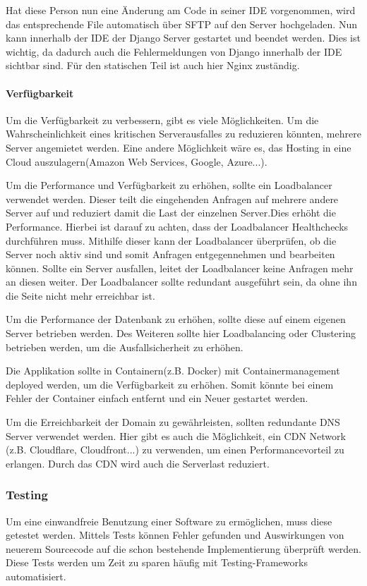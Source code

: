 Hat diese Person nun eine Änderung am Code in seiner IDE vorgenommen, wird das entsprechende File automatisch über SFTP auf den Server hochgeladen. Nun kann innerhalb der IDE der Django Server gestartet und beendet werden. Dies ist wichtig, da dadurch auch die Fehlermeldungen von Django innerhalb der \gls{IDE} sichtbar sind. Für den statischen Teil ist auch hier Nginx zuständig.

\paragraph{Verfügbarkeit}
Um die Verfügbarkeit zu verbessern, gibt es viele Möglichkeiten. Um die Wahrscheinlichkeit eines kritischen Serverausfalles zu reduzieren könnten, mehrere Server angemietet werden. Eine andere Möglichkeit wäre es, das Hosting in eine Cloud auszulagern(Amazon Web Services, Google, Azure...). 

Um die Performance und Verfügbarkeit zu erhöhen, sollte ein Loadbalancer verwendet werden. Dieser teilt die eingehenden Anfragen auf mehrere andere Server auf und reduziert damit die Last der einzelnen Server.Dies erhöht die Performance. Hierbei ist darauf zu achten, dass der Loadbalancer Healthchecks durchführen muss. Mithilfe dieser kann der Loadbalancer überprüfen, ob die Server noch aktiv sind und somit Anfragen entgegennehmen und bearbeiten können. Sollte ein Server ausfallen, leitet der Loadbalancer keine Anfragen mehr an diesen weiter. Der Loadbalancer sollte redundant ausgeführt sein, da ohne ihn die Seite nicht mehr erreichbar ist. 

Um die Performance der Datenbank zu erhöhen, sollte diese auf einem eigenen Server betrieben werden. Des Weiteren sollte hier Loadbalancing oder Clustering betrieben werden, um die Ausfallsicherheit zu erhöhen. \citep{CLUSTER}

Die Applikation sollte in Containern(z.B. Docker) mit Containermanagement deployed werden, um die Verfügbarkeit zu erhöhen. Somit könnte bei einem Fehler der Container einfach entfernt und ein Neuer gestartet werden. 

Um die Erreichbarkeit der Domain zu gewährleisten, sollten redundante DNS Server verwendet werden. Hier gibt es auch die Möglichkeit, ein CDN Network (z.B. Cloudflare, Cloudfront...) zu verwenden, um einen Performancevorteil zu erlangen. Durch das CDN wird auch die Serverlast reduziert.

\newpage

\subsubsection{Testing}
Um eine einwandfreie Benutzung einer Software zu ermöglichen, muss diese getestet werden. Mittels Tests können Fehler gefunden und Auswirkungen von neuerem Sourcecode auf die schon bestehende Implementierung überprüft werden. Diese Tests werden um Zeit zu sparen häufig mit Testing-Frameworks automatisiert.

